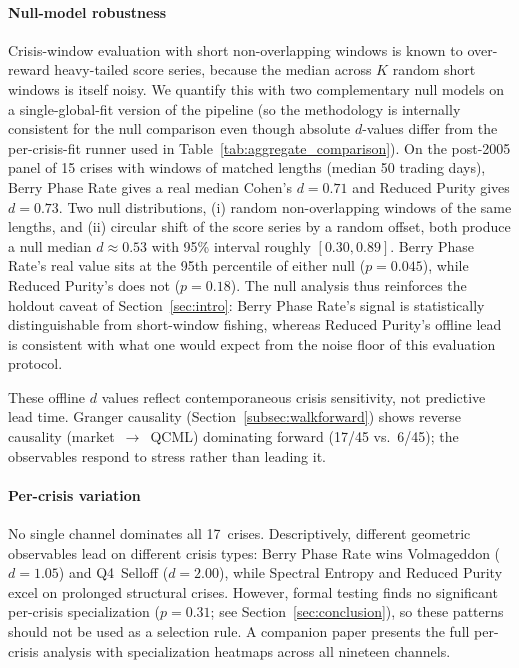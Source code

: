 \documentclass[3p]{elsarticle}
\begin{document}
\paragraph{Null-model robustness}
Crisis-window evaluation with short non-overlapping windows is
known to over-reward heavy-tailed score series, because the
median across $K$ random short windows is itself noisy.  We
quantify this with two complementary null models on a
single-global-fit version of the pipeline (so the methodology
is internally consistent for the null comparison even though
absolute $d$-values differ from the per-crisis-fit runner used
in Table~\ref{tab:aggregate_comparison}).  On the post-2005
panel of 15 crises with windows of matched lengths (median 50
trading days), Berry Phase Rate gives a real median Cohen's
$d = 0.71$ and Reduced Purity gives $d = 0.73$.  Two null
distributions, (i) random non-overlapping windows of the same
lengths, and (ii) circular shift of the score series by a
random offset, both produce a null median $d \approx 0.53$
with 95\% interval roughly $[0.30, 0.89]$.  Berry Phase Rate's
real value sits at the 95th percentile of either null
($p = 0.045$), while Reduced Purity's does not
($p = 0.18$).  The null analysis thus reinforces the holdout
caveat of Section~\ref{sec:intro}: Berry Phase Rate's signal
is statistically distinguishable from short-window
fishing, whereas Reduced Purity's offline lead is consistent
with what one would expect from the noise floor of this
evaluation protocol.

These offline $d$ values reflect contemporaneous crisis sensitivity,
not predictive lead time.  Granger causality
(Section~\ref{subsec:walkforward}) shows reverse causality
(market~$\to$~QCML) dominating forward (17/45 vs.\ 6/45); the
observables respond to stress rather than leading it.

\begin{table}[htbp]
\centering
\caption{Top 10 methods by median Cohen's $d$ across 17 crises
  (of 46 total).  Mean rank computed over all 46~methods.}
\label{tab:aggregate_comparison}
\small

\end{table}

\paragraph{Per-crisis variation}
No single channel dominates all 17~crises.  Descriptively, different
geometric observables lead on different crisis types: Berry Phase
Rate wins Volmageddon ($d = 1.05$) and Q4~Selloff ($d = 2.00$),
while Spectral Entropy and Reduced Purity excel on prolonged
structural crises.  However, formal testing finds no significant per-crisis
specialization ($p = 0.31$; see Section~\ref{sec:conclusion}), so
these patterns should not be used as a selection rule.
A companion paper presents the full per-crisis analysis
with specialization heatmaps across all nineteen channels.
\end{document}
